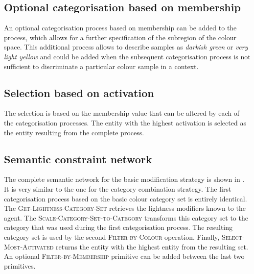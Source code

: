 \subsection{Optional categorisation based on membership}

An optional categorisation process based on membership can be added to
the process, which allows for a further specification of the subregion
of the colour space. This additional process allows to describe
samples as \textit{darkish green} or \textit{very light yellow} and could be
added when the subsequent categorisation process is not sufficient to
discriminate a particular colour sample in a context.

\subsection{Selection based on activation}

The selection is based on the membership value that can be altered by
each of the categorisation processes. The entity with the highest
activation is selected as the entity resulting from the complete
process.

\subsection{Semantic constraint network}

The complete semantic network for the basic modification
  strategy is shown in . It is
very similar to the one for the category combination
  strategy. The first categorisation process based on the basic
colour category set is entirely identical. The
\textsc{Get-Lightness-Category-Set} retrieves the lightness
modifiers known to the agent. The
\textsc{Scale-Category-Set-to-Category} transforms this category set
to the category that was used during the first categorisation
process. The resulting category set is used by the second
\textsc{Filter-by-Colour} operation. Finally,
\textsc{Select-Most-Activated} returns the entity with the highest
entity from the resulting set. An optional
\textsc{Filter-by-Membership} primitive can be added between the last
two primitives.

